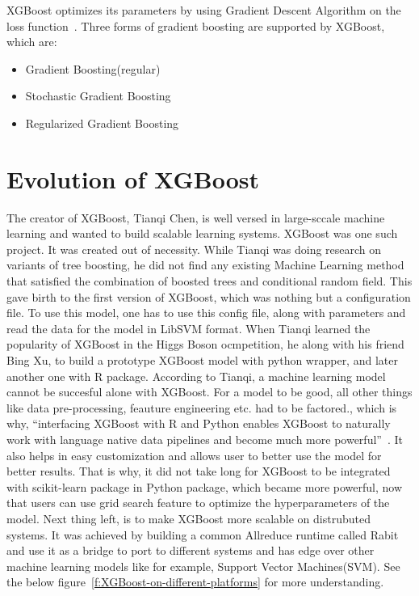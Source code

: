 XGBoost optimizes its parameters by using Gradient Descent Algorithm on the loss
function~\cite{hid-sp18-401-XGBoost-MLmastery}. Three forms of gradient
boosting  are supported by XGBoost, which are:

\begin{itemize}
\item Gradient Boosting(regular)
\item Stochastic Gradient Boosting
\item Regularized Gradient Boosting 
\end{itemize}

\section{Evolution of XGBoost} 

The creator of XGBoost, Tianqi Chen, is well versed in large-sccale machine
learning and wanted to build scalable learning systems. XGBoost was one such
project. It was created out of necessity. While Tianqi was doing research on
variants of tree boosting, he did not find any existing Machine Learning
method that satisfied the  combination of boosted trees and conditional random
field. This gave birth to the first version of XGBoost, which was nothing but
a configuration file. To use this model,  one has to use this config file,
along with parameters and read the data for the model in LibSVM format. When
Tianqi learned the popularity of XGBoost in the Higgs Boson ocmpetition, he
along with his friend Bing Xu, to build a prototype XGBoost model with python
wrapper, and later another one with R package. According to Tianqi, a machine
learning model cannot be succesful alone with XGBoost. For a model to be good,
all other things like data pre-processing, feauture engineering etc. had to be
factored., which is why, ``interfacing XGBoost with R and Python enables
XGBoost to naturally work with language native data pipelines and become much
more powerful''~\cite{hid-sp18-401-XGBoost-evolution}. It also helps in easy
customization and allows user to better use the model for better results. That
is why, it did not take long for XGBoost to be integrated with scikit-learn
package in Python package, which became more powerful, now that users can use
grid search feature to optimize the hyperparameters of the model. Next thing
left, is to make XGBoost more scalable on distrubuted systems. It was achieved
by building a common Allreduce runtime called Rabit and use it as a bridge to
port to different systems and  has edge over other machine learning models
like for example, Support Vector Machines(SVM).
See the below figure~\ref{f:XGBoost-on-different-platforms} for more
understanding.

